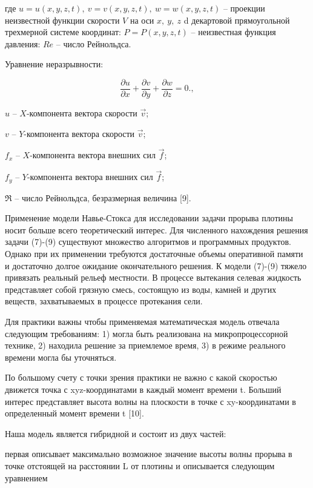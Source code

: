 где \(u = u(x,y,z,t),\ v = v(x,y,z,t),\ w = w(x,y,z,t)\) -- проекции
неизвестной функции скорости \(V\) на оси \(x,\ y,\ z\) d декартовой
прямоугольной трехмерной системе координат: \(P = P(x,y,z,t)\) --
неизвестная функция давления: \(Re\) -- число Рейнольдса.

Уравнение неразрывности:

\begin{equation}
\frac{\partial u}{\partial x} + \frac{\partial v}{\partial y} + \frac{\partial w}{\partial z} = 0.,
\end{equation}

\begin{multicols}{2}
\(u\) -- \(X\)-компонента вектора скорости \(\overrightarrow{v}\);

\(v\) -- \(Y\)-компонента вектора скорости \(\overrightarrow{v}\);

\(f_{x}\) -- \(X\)-компонента вектора внешних сил
\(\overrightarrow{f}\);

\(f_{y}\) -- \(Y\)-компонента вектора внешних сил
\(\overrightarrow{f}\);

\(\Re\) -- число Рейнольдса, безразмерная величина {[}9{]}.

Применение модели Навье-Стокса для исследовании задачи прорыва плотины
носит больше всего теоретический интерес. Для численного нахождения
решения задачи (7)-(9) существуют множество алгоритмов и программных
продуктов. Однако при их применении требуются достаточные объемы
оперативной памяти и достаточно долгое ожидание окончательного решения.
К модели (7)-(9) тяжело привязать реальный рельеф местности. В процессе
вытекания селевая жидкость представляет собой грязную смесь, состоящую
из воды, камней и других веществ, захватываемых в процессе протекания
сели.

Для практики важны чтобы применяемая математическая модель отвечала
следующим требованиям: 1) могла быть реализована на микропроцессорной
технике, 2) находила решение за приемлемое время, 3) в режиме реального
времени могла бы уточняться.

По большому счету с точки зрения практики не важно с какой скоростью
движется точка с xyz-координатами в каждый момент времени t. Больший
интерес представляет высота волны на плоскости в точке с xy-координатами
в определенный момент времени t {[}10{]}.

Наша модель является гибридной и состоит из двух частей:

первая описывает максимально возможное значение высоты волны прорыва в
точке отстоящей на расстоянии L от плотины и описывается следующим
уравнением
\end{multicols}


